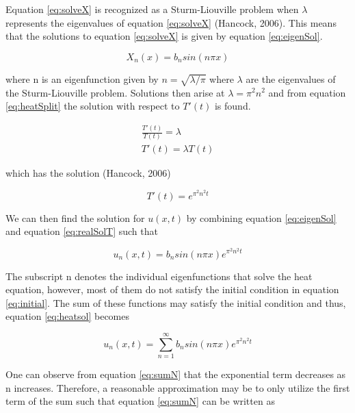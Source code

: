 \documentclass[12pt,a4paper]{article}
\begin{document}
\noindent Equation \ref{eq:solveX} is recognized as a Sturm-Liouville problem when $\lambda$ represents the eigenvalues of equation \ref{eq:solveX} (Hancock, 2006). This means that the solutions to equation \ref{eq:solveX} is given by equation \ref{eq:eigenSol}.

\begin{equation}\label{eq:eigenSol}
X_n(x)= b_n sin(n\pi x)
\end{equation}

\noindent where n is an eigenfunction given by $n = \sqrt{\lambda/\pi}$ where $\lambda$ are the eigenvalues of the Sturm-Liouville problem. Solutions then arise at $\lambda = \pi^2 n^2$ and from equation \ref{eq:heatSplit} the solution with respect to $T'(t)$ is found.

\begin{equation}\label{eq:eigenSolT}
\begin{aligned}
\frac{T'(t)}{T(t)} = \lambda
\\
T'(t) = \lambda T(t)
\end{aligned}
\end{equation}

\noindent which has the solution (Hancock, 2006)

\begin{equation}\label{eq:realSolT}
T'(t) = e^{\pi^2 n^2 t}
\end{equation}

\noindent We can then find the solution for $u(x,t)$ by combining equation \ref{eq:eigenSol} and equation \ref{eq:realSolT} such that

\begin{equation}\label{eq:heatsol}
u_n(x,t) = b_n sin(n\pi x)e^{\pi^2 n^2 t}
\end{equation}

\noindent The subscript n denotes the individual eigenfunctions that solve the heat equation, however, most of them do not satisfy the initial condition in equation \ref{eq:initial}. The sum of these functions may satisfy the initial condition and thus, equation \ref{eq:heatsol} becomes

\begin{equation}\label{eq:sumN}
u_n(x,t) = \sum_{n=1}^{\infty} b_n sin(n\pi x)e^{\pi^2 n^2 t}
\end{equation}

\noindent One can observe from equation \ref{eq:sumN} that the exponential term decreases as n increases. Therefore, a reasonable approximation may be to only utilize the first term of the sum such that equation \ref{eq:sumN} can be written as
\end{document}
